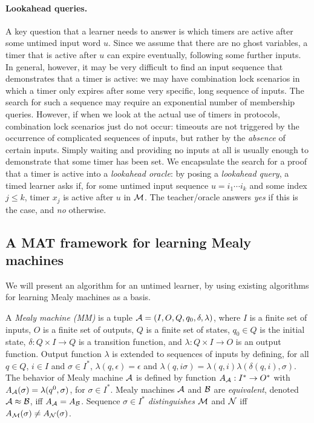 \paragraph{Lookahead queries.}
A key question that a learner needs to answer is which timers are active after some untimed input word $u$.
Since we assume that there are no ghost variables, a timer that is active after $u$ can expire eventually,
following some further inputs.
In general, however, it may be very difficult to find an input sequence that demonstrates that a timer is active: we may have combination lock scenarios
in which a timer only expires after some very specific, long sequence of inputs.
The search for such a sequence may require an exponential number of membership queries.
However, if when we look at the actual use of timers in protocols, combination lock scenarios just do not occur:
timeouts are not triggered by the occurrence of complicated sequences of inputs, 
but rather by the \emph{absence} of certain inputs.
Simply waiting and providing no inputs at all is usually enough to demonstrate that some timer has been set.
We encapsulate the search for a proof that a timer is active into a \emph{lookahead oracle}:
by posing a \emph{lookahead query}, a timed learner asks if, for some untimed input sequence $u = i_1 \cdots i_k$ and some
index $j \leq k$, timer $x_j$ is active after $u$ in ${\cal M}$.
The teacher/oracle answers \emph{yes} if this is the case, and \emph{no} otherwise.

\subsection{A MAT framework for learning Mealy machines}
We will present an algorithm for an untimed learner, by using existing algorithms for learning Mealy machines as a basis.

A \emph{Mealy machine (MM)} is a tuple ${\cal A} = (I, O, Q, q_0, \delta, \lambda)$, where
$I$ is a finite set of inputs,
$O$ is a finite set of outputs,
$Q$ is a finite set of states,
$q_0 \in Q$ is the initial state,
$\delta: Q \times I \rightarrow Q$ is a transition function, and
$\lambda: Q \times I \rightarrow O$ is an output function.
%
Output function $\lambda$ is extended to sequences of inputs by defining,
for all $q \in Q$, $i \in I$ and $\sigma \in I^{\ast}$,
$\lambda(q, \epsilon) = \epsilon$ and $\lambda(q, i \sigma) = \lambda(q, i) \lambda(\delta(q, i), \sigma)$.
%
The behavior of Mealy machine ${\cal A}$ is defined by function $A_{\cal A} : I^{\ast} \rightarrow O^{\ast}$ with
$A_{\cal A}(\sigma) = \lambda (q^0, \sigma)$, for  $\sigma \in I^{\ast}$.
Mealy machines ${\cal A}$ and ${\cal B}$ are \emph{equivalent}, denoted ${\cal A} \approx {\cal B}$, iff $A_{{\cal A}} = A_{{\cal B}}$.
Sequence $\sigma \in I^{\ast}$ \emph{distinguishes}
${\cal M}$ and ${\cal N}$ iff $A_{{\cal M}}(\sigma) \neq A_{{\cal N}}(\sigma)$.


